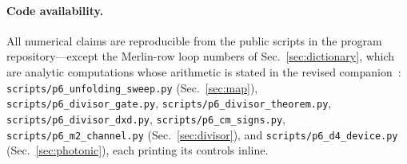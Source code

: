﻿\documentclass[11pt]{article}
\theoremstyle{remark}
\begin{document}
\paragraph{Code availability.} All numerical claims are
reproducible from the public scripts in the program
repository---except the Merlin-row loop numbers of
Sec.~\ref{sec:dictionary}, which are analytic computations whose
arithmetic is stated in the revised companion~\cite{choosing}:
\texttt{scripts/p6\_unfolding\_sweep.py} (Sec.~\ref{sec:map}),
\texttt{scripts/p6\_divisor\_gate.py}, \texttt{scripts/p6\_divisor\_theorem.py},
\texttt{scripts/p6\_divisor\_dxd.py}, \texttt{scripts/p6\_cm\_signs.py},
\texttt{scripts/p6\_m2\_channel.py}
(Sec.~\ref{sec:divisor}), and \texttt{scripts/p6\_d4\_device.py}
(Sec.~\ref{sec:photonic}), each printing its controls inline.
\end{document}
